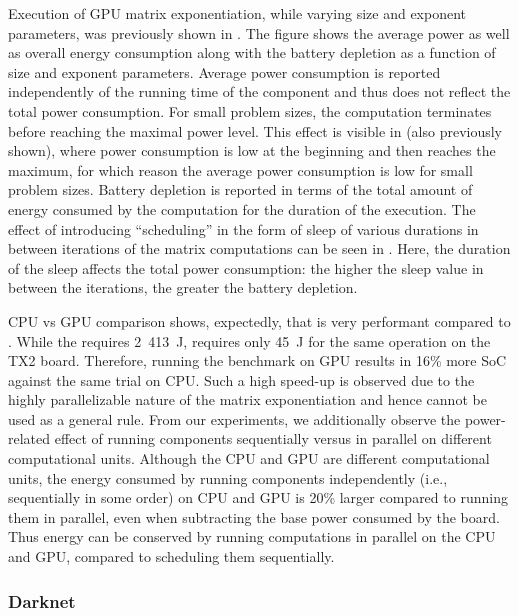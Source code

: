Execution of GPU matrix exponentiation, while varying size and exponent parameters, was previously shown in . The figure shows the average power as well as overall energy consumption along with the battery depletion as a function of size and exponent parameters. Average power consumption is reported independently of the running time of the component and thus does not reflect the total power consumption. For small problem sizes, the computation terminates before reaching the maximal power level. This effect is visible in  (also previously shown), where power consumption is low at the beginning and then reaches the maximum, for which reason the average power consumption is low for small problem sizes. Battery depletion is reported in terms of the total amount of energy consumed by the computation for the duration of the execution. The effect of introducing ``scheduling'' in the form of sleep of various durations in between iterations of the matrix computations can be seen in . Here, the duration of the sleep affects the total power consumption: the higher the sleep value in between the iterations, the greater the battery depletion.

CPU vs GPU comparison shows, expectedly, that  is very performant compared to . While the  requires 2~413~J,  requires only 45~J for the same operation on the TX2 board. Therefore, running the benchmark on GPU results in 16\% more SoC against the same trial on CPU. Such a high speed-up is observed due to the highly parallelizable nature of the matrix exponentiation and hence cannot be used as a general rule. From our experiments, we additionally observe the power-related effect of running components sequentially versus in parallel on different computational units. Although the CPU and GPU are different computational units, the energy consumed by running components independently (i.e., sequentially in some order) on CPU and GPU is 20\% larger compared to running them in parallel, even when subtracting the base power consumed by the board. Thus %
energy can be conserved by running computations in parallel on the CPU and GPU, compared to scheduling them sequentially.


\subsubsection*{\color{cyan}Darknet}
\label{sec:experimental-results:darknet}


